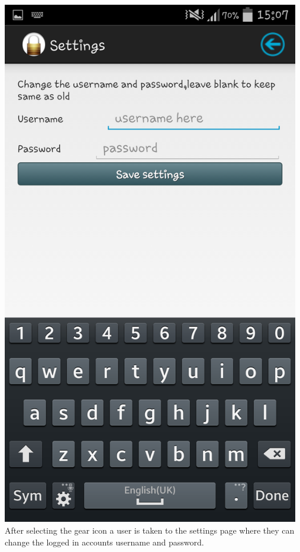 \begin{center}
 \includegraphics[width=13cm]{screenshots/normal/4_Settings.png}
\textbf{\\}
 After selecting the gear icon a user is taken to the settings page where they can change the logged in accounts username and password.
\end{center}
